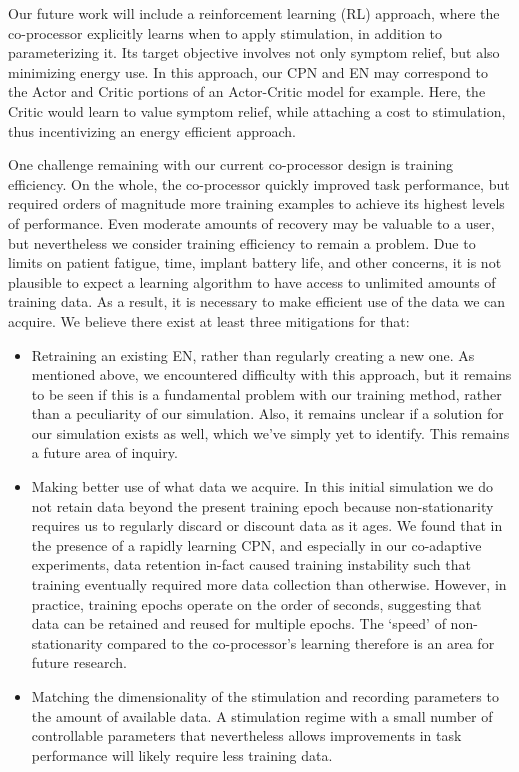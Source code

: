 \documentclass[12pt]{iopart}
\begin{document}
Our future work will include a reinforcement learning (RL) approach, where the co-processor
explicitly learns when to apply stimulation, in addition to parameterizing it. Its target
objective involves not only symptom relief, but also minimizing energy use. In this approach,
our CPN and EN may correspond to the Actor and Critic portions of an Actor-Critic model
for example. Here, the Critic would learn to value symptom relief, while attaching a cost
to stimulation, thus incentivizing an energy efficient approach.

One challenge remaining with our current co-processor design is training efficiency.
On the whole, the co-processor quickly improved task performance, but required orders of
magnitude more training examples to achieve its highest levels of performance. Even
moderate amounts of recovery may be valuable to a user, but nevertheless we consider
training efficiency to remain a problem. Due to limits on patient fatigue, time, implant
battery life, and other concerns, it is not plausible to expect a learning algorithm
to have access to unlimited amounts of training data. As a result, it is necessary to
make efficient use of the data we can acquire. We believe there exist at least three
mitigations for that:

\begin{itemize}
	\item Retraining an existing EN, rather than regularly creating a new one. As
	      mentioned above, we encountered difficulty with this approach, but it remains
	      to be seen if this is a fundamental problem with our training method, rather
	      than a peculiarity of our simulation. Also, it remains unclear if a solution
	      for our simulation exists as well, which we've simply yet to identify. This
	      remains a future area of inquiry.
	\item Making better use of what data we acquire. In this initial simulation we do
	      not retain data beyond the present training epoch because non-stationarity requires us to
	      regularly discard or discount data as it ages. We found that in the presence
	      of a rapidly learning CPN, and especially in our co-adaptive experiments,
	      data retention in-fact caused training instability such that training
	      eventually required more data collection than otherwise. However, in
	      practice, training epochs operate on the order of seconds, suggesting
	      that data can be retained and reused for multiple epochs. The `speed' of 
	      non-stationarity compared to the co-processor's learning therefore is an
	      area for future research.
	\item Matching the dimensionality of the stimulation and recording parameters
	      to the amount of available data. A stimulation regime with
	      a small number of controllable parameters that nevertheless allows
	      improvements in task performance  will likely require less training data.
\end{itemize}
\end{document}

